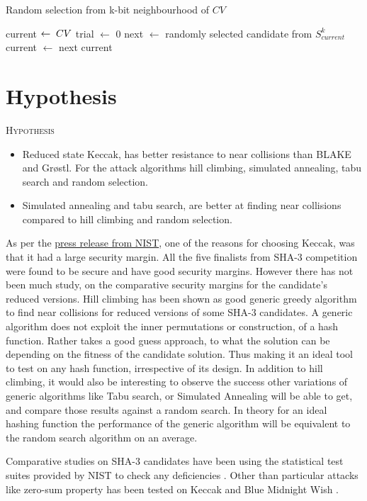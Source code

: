 \begin{algorithm}[h]
  \caption{ Random selection from k-bit neighbourhood of $CV$ }
  \begin{algorithmic}[1]
      \State current $\gets \thickspace CV$
      \State trial $\gets$ 0
        \State next $\gets$ randomly selected candidate from $S^{k}_{current}$
          \State current $\gets$ next
        \EndIf
      \EndWhile 
      \State \Return current
    \EndFunction
  \end{algorithmic}
\end{algorithm}

\section{Hypothesis}

\begin{center}
  \framebox
  {
    \parbox{400pt}
    {
      \centering \textsc{Hypothesis} \\
      \begin{itemize}
      \item Reduced state Keccak, has better resistance to near collisions than BLAKE and Gr{\o}stl. For the
      attack algorithms hill climbing, simulated annealing, tabu search and random selection.
      \item Simulated annealing and tabu search, are better at finding near collisions compared to hill 
      climbing and random selection.
      \end{itemize}
    }
  }
\end{center}

As per the \href{"http://csrc.nist.gov/groups/ST/hash/sha-3/sha-3\_selection\_announcement.pdf"}{press release from NIST}, 
one of the reasons for choosing Keccak, was that it had a large security margin. All the five finalists from SHA-3 competition
were found to be secure and have good security margins. However there has not been much study, on the comparative security
margins for the candidate's reduced versions. Hill climbing has been shown as good generic greedy algorithm to find 
near collisions for reduced versions of some SHA-3 candidates. A generic algorithm does not exploit the inner permutations
or construction, of a hash function. Rather takes a good guess approach, to what the solution can be depending on the fitness
of the candidate solution. Thus making it an ideal tool to test on any hash function, irrespective of its design. In addition
to hill climbing, it would also be interesting to observe the success other variations of generic algorithms like Tabu search,
or Simulated Annealing will be able to get, and compare those results against a random search. In theory for an ideal hashing
function the performance of the generic algorithm will be equivalent to the random search algorithm on an average.

Comparative studies on SHA-3 candidates have been using the statistical test suites provided by NIST to check any 
deficiencies \cite{00030} \cite{00032}. Other than particular attacks like zero-sum property has been tested on 
Keccak and Blue Midnight Wish \cite{00031}.
